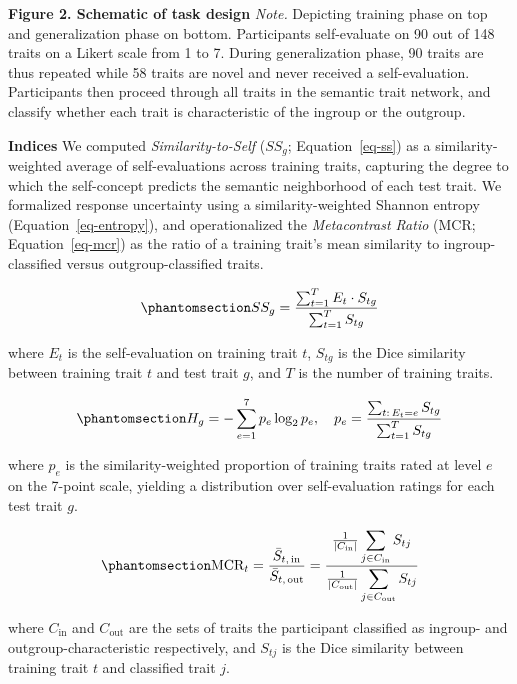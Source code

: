 \documentclass[
  man,
  longtable,
  nolmodern,
  notxfonts,
  notimes,
  man]{apa7}
\begin{document}
\textbf{Figure 2. Schematic of task design} \emph{Note.} Depicting
training phase on top and generalization phase on bottom. Participants
self-evaluate on 90 out of 148 traits on a Likert scale from 1 to 7.
During generalization phase, 90 traits are thus repeated while 58 traits
are novel and never received a self-evaluation. Participants then
proceed through all traits in the semantic trait network, and classify
whether each trait is characteristic of the ingroup or the outgroup.

\textbf{Indices} We computed \emph{Similarity-to-Self} (\(SS_g\);
Equation~\ref{eq-ss}) as a similarity-weighted average of
self-evaluations across training traits, capturing the degree to which
the self-concept predicts the semantic neighborhood of each test trait.
We formalized response uncertainty using a similarity-weighted Shannon
entropy (Equation~\ref{eq-entropy}), and operationalized the
\emph{Metacontrast Ratio} (MCR; Equation~\ref{eq-mcr}) as the ratio of a
training trait's mean similarity to ingroup-classified versus
outgroup-classified traits.

\begin{equation}\phantomsection\label{eq-ss}{SS_g = \frac{\sum_{t=1}^{T} E_t \cdot S_{tg}}{\sum_{t=1}^{T} S_{tg}}}\end{equation}

where \(E_t\) is the self-evaluation on training trait \(t\), \(S_{tg}\)
is the Dice similarity between training trait \(t\) and test trait
\(g\), and \(T\) is the number of training traits.

\begin{equation}\phantomsection\label{eq-entropy}{H_g = -\sum_{e=1}^{7} p_e \log_2 p_e, \quad p_e = \frac{\sum_{t:\, E_t = e} S_{tg}}{\sum_{t=1}^{T} S_{tg}}}\end{equation}

where \(p_e\) is the similarity-weighted proportion of training traits
rated at level \(e\) on the 7-point scale, yielding a distribution over
self-evaluation ratings for each test trait \(g\).

\begin{equation}\phantomsection\label{eq-mcr}{\text{MCR}_t = \frac{\bar{S}_{t,\,\text{in}}}{\bar{S}_{t,\,\text{out}}} = \frac{\frac{1}{|C_\text{in}|}\displaystyle\sum_{j \in C_\text{in}} S_{tj}}{\frac{1}{|C_\text{out}|}\displaystyle\sum_{j \in C_\text{out}} S_{tj}}}\end{equation}

where \(C_\text{in}\) and \(C_\text{out}\) are the sets of traits the
participant classified as ingroup- and outgroup-characteristic
respectively, and \(S_{tj}\) is the Dice similarity between training
trait \(t\) and classified trait \(j\).
\end{document}
